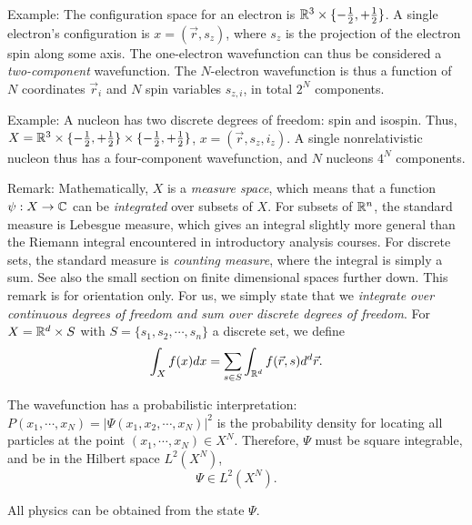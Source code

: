 \documentclass{report}
\theoremstyle{plain}
\theoremstyle{definition}
\begin{document}
Example: The configuration space for an electron is $\mathbb{R}^3 \times
\{-\tfrac{1}{2},+\tfrac{1}{2}\}$. A single electron's configuration is $x = (\vec{r},s_z)$,
where $s_z$ is the projection of the electron spin along some
axis. The one-electron wavefunction can thus be considered a
\emph{two-component} wavefunction. The $N$-electron wavefunction is thus a function of $N$
coordinates $\vec{r}_i$ and $N$ spin variables $s_{z,i}$, in total
$2^N$ components.

Example: A nucleon has two discrete degrees of freedom: spin and
isospin. Thus, $X = \mathbb{R}^3 \times \{-\tfrac{1}{2},+\tfrac{1}{2}\}
\times \{-\tfrac{1}{2},+\tfrac{1}{2}\}$, $x = (\vec{r},s_z,i_z)$. A
single nonrelativistic nucleon thus has a four-component
wavefunction, and $N$ nucleons $4^N$ components.
 

Remark: Mathematically, $X$ is a \emph{measure space}, which means
that a function $ \psi : X \to \mathbb{C}$ can be \emph{integrated} over
subsets of $X$. For
subsets of $\mathbb{R}^n$, the standard measure is Lebesgue measure, which
gives an integral slightly more general than the Riemann integral
encountered in introductory analysis courses. For discrete sets, the
standard measure is \emph{counting measure}, where the integral is
simply a sum. See also the small section on finite dimensional spaces
further down. This remark is for orientation only. For us,
we simply state that we \emph{integrate over continuous degrees of
  freedom and sum over discrete degrees of freedom}. For $X = \mathbb{R}^d
\times S$ with $S = \{ s_1 , s_2, \cdots , s_n\}$ a discrete set, we define
\[ \int_X f(x) dx = \sum_{s\in S} \int_{\mathbb{R}^d} f(\vec{r},s) d^d
\vec{r}. \]

The wavefunction has a probabilistic interpretation:
$P(x_1,\cdots,x_N) = |\Psi(x_1,x_2,\cdots,x_N)|^2$ is the probability density for locating
all particles at the point $(x_1,\cdots,x_N)\in X^N$. Therefore,
$\Psi$ must be square integrable, and be in the Hilbert space $L^2(X^N)$,
\begin{equation}
  \Psi \in L^2(X^N).
\end{equation}


All physics can be obtained from the state $\Psi$.
\end{document}
